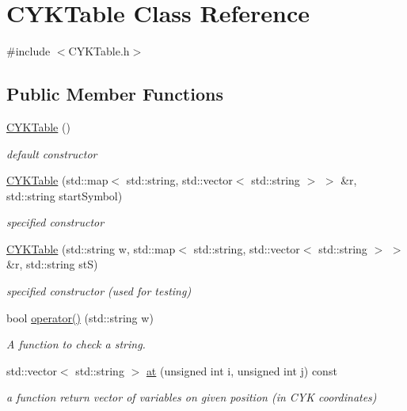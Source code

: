 \hypertarget{classCYKTable}{\section{C\-Y\-K\-Table Class Reference}
\label{classCYKTable}
}


{\ttfamily \#include $<$C\-Y\-K\-Table.\-h$>$}

\subsection*{Public Member Functions}
\begin{DoxyCompactItemize}
\item 
\hyperlink{classCYKTable_ac96905a2f347c63cfda59d55fc97d90a}{C\-Y\-K\-Table} ()
\begin{DoxyCompactList}\small\item\em default constructor \end{DoxyCompactList}\item 
\hyperlink{classCYKTable_a9bcbd180cfda8d5c47587f67026d89ad}{C\-Y\-K\-Table} (std\-::map$<$ std\-::string, std\-::vector$<$ std\-::string $>$ $>$ \&r, std\-::string start\-Symbol)
\begin{DoxyCompactList}\small\item\em specified constructor \end{DoxyCompactList}\item 
\hyperlink{classCYKTable_abd9ea746b2c4ed848819efbf95645cc4}{C\-Y\-K\-Table} (std\-::string w, std\-::map$<$ std\-::string, std\-::vector$<$ std\-::string $>$ $>$ \&r, std\-::string st\-S)
\begin{DoxyCompactList}\small\item\em specified constructor (used for testing) \end{DoxyCompactList}\item 
bool \hyperlink{classCYKTable_ac756a60dc99c8557ad5d11e557b30f57}{operator()} (std\-::string w)
\begin{DoxyCompactList}\small\item\em A function to check a string. \end{DoxyCompactList}\item 
std\-::vector$<$ std\-::string $>$ \hyperlink{classCYKTable_a9d53e2b07637d13ed72b97b007a09cf4}{at} (unsigned int i, unsigned int j) const 
\begin{DoxyCompactList}\small\item\em a function return vector of variables on given position (in C\-Y\-K coordinates) \end{DoxyCompactList}\item 

\end{DoxyCompactItemize}
